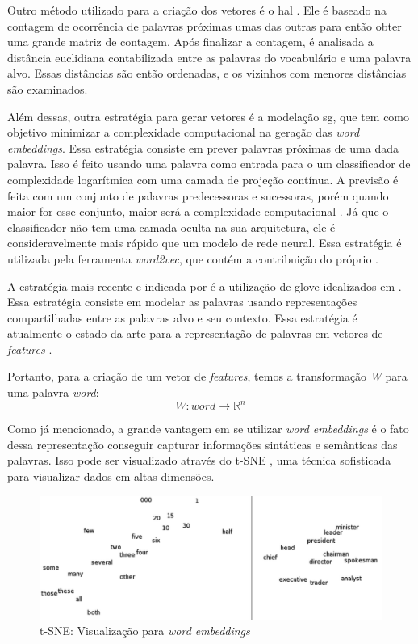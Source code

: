 Outro método utilizado para a criação dos vetores é o \ac{hal} \cite{lund1996producing}. Ele é baseado na contagem de ocorrência de palavras próximas umas das outras para então obter uma grande matriz de contagem. Após finalizar a contagem, é analisada a distância euclidiana contabilizada entre as palavras do vocabulário e uma palavra alvo. Essas distâncias são então ordenadas, e os vizinhos com menores distâncias são examinados.

Além dessas, outra estratégia para gerar vetores é a modelação \ac{sg}, que tem como objetivo minimizar a complexidade computacional na geração das \textit{word embeddings}. Essa estratégia consiste em prever palavras próximas de uma dada palavra. Isso é feito usando uma palavra como entrada para o um classificador de complexidade logarítmica com uma camada de projeção contínua. A previsão é feita com um conjunto de palavras predecessoras e sucessoras, porém quando maior for esse conjunto, maior será a complexidade computacional \cite{mikolov2013efficient}. Já que o classificador não tem uma camada oculta na sua arquitetura, ele é consideravelmente mais rápido que um modelo de rede neural. Essa estratégia é utilizada pela ferramenta \textit{word2vec}, que contém a contribuição do próprio .

A estratégia mais recente e indicada por  é a utilização de \ac{glove} idealizados em \cite{luo2015learning}. Essa estratégia consiste em modelar as palavras usando representações compartilhadas entre as palavras alvo e seu contexto. Essa estratégia é atualmente o estado da arte para a representação de palavras em vetores de \textit{features} \cite{pennington2014glove}.

Portanto, para a criação de um vetor de \textit{features}, temos a transformação \textit{W} para uma palavra \textit{word}:
\begin{equation}
W:word \to \mathbb{R}^n
\end{equation}

Como já mencionado, a grande vantagem em se utilizar \textit{word embeddings} é o fato dessa representação conseguir capturar informações sintáticas e semânticas das palavras. Isso pode ser visualizado através do t-SNE \cite{van2008visualizing}, uma técnica sofisticada para visualizar dados em altas dimensões.

\begin{figure}[htb]
  \caption{t-SNE: Visualização para \textit{word embeddings}}\label{fig:wordtsne}
  \begin{center}
      \includegraphics[scale=0.25]{img/Turian-WordTSNE}
  \end{center}
\end{figure}

